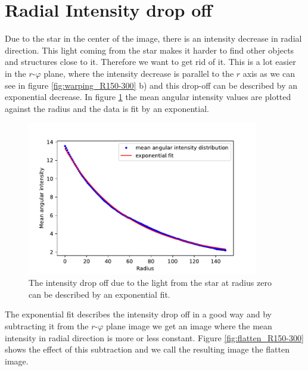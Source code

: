 \section{Radial Intensity drop off}
\label{sec:radial_intensity}
Due to the star in the center of the image, there is an intensity decrease in radial direction. This light coming from the star makes it harder to find other objects and structures close to it. Therefore we want to get rid of it. This is a lot easier in the $r$-$\varphi$ plane, where the intensity decrease is parallel to the $r$ axis as we can see in figure \ref{fig:warping_R150-300} b) and this drop-off can be described by an exponential decrease. In figure \ref{fig:mean_angular_intensity_R150_300} the mean angular intensity values are plotted against the radius and the data is fit by an exponential.
\begin{figure}[H]
	\centering
		\includegraphics[width=0.9\textwidth]{pics/mean_angular_intensity_R150_300.pdf}
\caption{The intensity drop off due to the light from the star at radius zero can be described by an exponential fit.}
\label{fig:mean_angular_intensity_R150_300}
\end{figure}
The exponential fit describes the intensity drop off in a good way and by subtracting it from the $r$-$\varphi$ plane image we get an image where the mean intensity in radial direction is more or less constant. Figure \ref{fig:flatten_R150-300} shows the effect of this subtraction and we call the resulting image the flatten image.  
